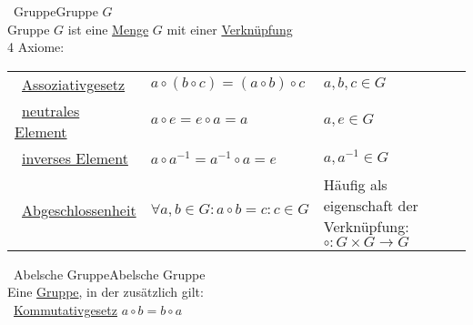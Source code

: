 		\begin{proposition}{\currentboxsection \ Gruppe}{Gruppe} \hspace{12cm} $G$ \label{gruppe}  \\
			Gruppe $G$ ist eine \hyperref[menge]{Menge} $G$ mit einer \hyperref[verknuepfung]{Verknüpfung} \\
			4 Axiome: \\
			\begin{tabular}{|m{3.5cm}|>{\centering\arraybackslash}m{5cm}|m{5.5cm}|}
				\hline
				\textbullet \ \hyperref[assoziativ]{Assoziativgesetz} & $a \circ (b \circ c) = (a \circ b) \circ c$ & $a,b,c \in G$ \\
				\textbullet \ \hyperref[neutral_element]{neutrales Element} & $a \circ e = e \circ a = a$ & $a,e \in G$ \\
				\textbullet \ \hyperref[invers_element]{inverses Element} & $a \circ a^{-1} = a^{-1} \circ a = e$ & $a, a^{-1} \in G$ \\
				\textbullet \ \hyperref[abgeschlossenheit_menge]{Abgeschlossenheit} & $\forall a,b \in G: a \circ b = c: c \in G$ & Häufig als eigenschaft der Verknüpfung: $\circ : G \times G \rightarrow G$ \\
				\hline
			\end{tabular}			
		\end{proposition}
		
		\begin{proposition}{\currentboxsection \ Abelsche Gruppe}{Abelsche Gruppe} \label{abelsche_gruppe}  \\
			Eine \hyperref[gruppe]{Gruppe}, in der zusätzlich gilt: \\
			\textbullet \ \hyperref[kommutativ]{Kommutativgesetz} \hspace{2cm} $a \circ b = b \circ a$
		\end{proposition}
		
